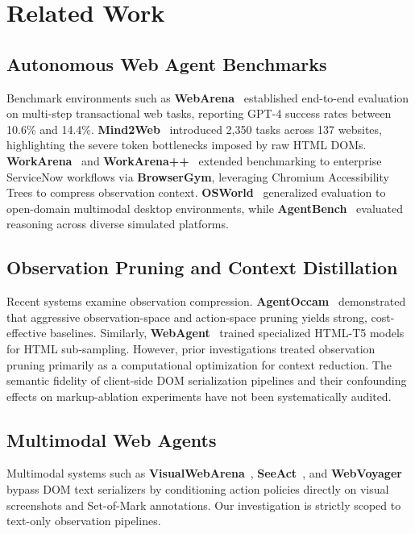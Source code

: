 \documentclass[conference]{IEEEtran}
\begin{document}
\section{Related Work}
\label{sec:related}

\subsection{Autonomous Web Agent Benchmarks}
Benchmark environments such as \textbf{WebArena}~\cite{zhou2024webarena} established end-to-end evaluation on multi-step transactional web tasks, reporting GPT-4 success rates between 10.6\% and 14.4\%. \textbf{Mind2Web}~\cite{deng2023mind2web} introduced 2,350 tasks across 137 websites, highlighting the severe token bottlenecks imposed by raw HTML DOMs. \textbf{WorkArena}~\cite{drouin2024workarena} and \textbf{WorkArena++}~\cite{workarenapp2024} extended benchmarking to enterprise ServiceNow workflows via \textbf{BrowserGym}, leveraging Chromium Accessibility Trees to compress observation context. \textbf{OSWorld}~\cite{osworld2024} generalized evaluation to open-domain multimodal desktop environments, while \textbf{AgentBench}~\cite{liu2024agentbench} evaluated reasoning across diverse simulated platforms.

\subsection{Observation Pruning and Context Distillation}
Recent systems examine observation compression. \textbf{AgentOccam}~\cite{agentoccam2025} demonstrated that aggressive observation-space and action-space pruning yields strong, cost-effective baselines. Similarly, \textbf{WebAgent}~\cite{gur2024webagent} trained specialized HTML-T5 models for HTML sub-sampling. However, prior investigations treated observation pruning primarily as a computational optimization for context reduction. The semantic fidelity of client-side DOM serialization pipelines and their confounding effects on markup-ablation experiments have not been systematically audited.

\subsection{Multimodal Web Agents}
Multimodal systems such as \textbf{VisualWebArena}~\cite{koh2024visualwebarena}, \textbf{SeeAct}~\cite{zheng2024seeact}, and \textbf{WebVoyager}~\cite{he2024webvoyager} bypass DOM text serializers by conditioning action policies directly on visual screenshots and Set-of-Mark annotations. Our investigation is strictly scoped to text-only observation pipelines.
\end{document}
